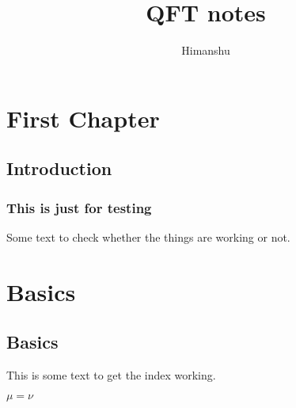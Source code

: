 \documentclass[11pt,a4paper]{book}
\author{Himanshu}
\title{QFT notes}
\begin{document}
\maketitle
\tableofcontents
	
    
\chapter{First Chapter}
\section{Introduction}
	
	
\subsection{This is just for testing}
	
Some text to check whether the things are working or not.
	
\chapter{Basics}
\section{Basics}
This is some text to get the index working.

$\mu = \nu$
	
	
\end{document}
